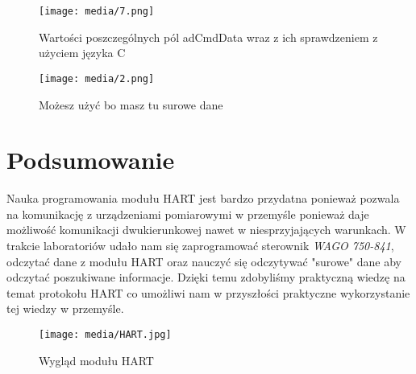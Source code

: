 \documentclass{article}
\begin{document}
\begin{figure}[H]
    \centering
    \texttt{[image: media/7.png]}
    \caption{Wartości poszczególnych pól adCmdData wraz z ich sprawdzeniem z użyciem języka C}
\end{figure}


\begin{figure}[H]
    \centering
    \texttt{[image: media/2.png]}
    \caption{Możesz użyć bo masz tu surowe dane}
\end{figure}

\newpage
\section{Podsumowanie}
Nauka programowania modułu HART jest bardzo przydatna ponieważ pozwala na komunikację z urządzeniami pomiarowymi w przemyśle ponieważ daje możliwość komunikacji dwukierunkowej nawet w niesprzyjających warunkach. W trakcie laboratoriów udało nam się zaprogramować sterownik \textit{WAGO 750-841}, odczytać dane z modułu HART oraz nauczyć się odczytywać "surowe" dane aby odczytać poszukiwane informacje. Dzięki temu zdobyliśmy praktyczną wiedzę na temat protokołu HART co umożliwi nam w przyszłości praktyczne wykorzystanie tej wiedzy w przemyśle.
\vspace{1em}
\begin{figure}[H]
    \centering
    \texttt{[image: media/HART.jpg]}
    \caption{Wygląd modułu HART}
\end{figure}
\end{document}
